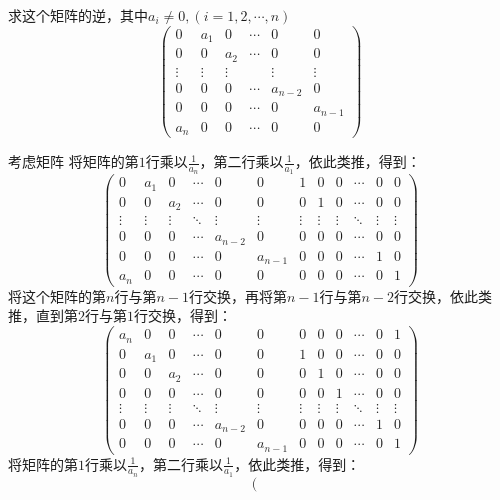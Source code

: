 \begin{example}{}{}
    求这个矩阵的逆，其中$a_i\neq 0,(i=1,2,\cdots,n)$\[\begin{pmatrix}0&a_1&0&\cdots&0&0\\0&0&a_2&\cdots&0&0\\\vdots&\vdots&\vdots&&\vdots&\vdots\\0&0&0&\cdots&a_{n-2}&0\\0&0&0&\cdots&0&a_{n-1}\\a_n&0&0&\cdots&0&0\end{pmatrix}\]
\end{example}
\begin{solution}
    考虑矩阵
将矩阵的第$1$行乘以$\frac{1}{a_n}$，第二行乘以$\frac{1}{a_1}$，依此类推，得到：
\[
\left(\begin{array}{cccccc|cccccc}
0 & a_1 & 0 & \cdots & 0 & 0 & 1 & 0 & 0 & \cdots & 0 & 0 \\
0 & 0 & a_2 & \cdots & 0 & 0 & 0 & 1 & 0 & \cdots & 0 & 0 \\
\vdots & \vdots & \vdots & \ddots & \vdots & \vdots & \vdots & \vdots & \vdots & \ddots & \vdots & \vdots \\
0 & 0 & 0 & \cdots & a_{n-2} & 0 & 0 & 0 & 0 & \cdots & 0 & 0 \\
0 & 0 & 0 & \cdots & 0 & a_{n-1} & 0 & 0 & 0 & \cdots & 1 & 0 \\
a_n & 0 & 0 & \cdots & 0 & 0 & 0 & 0 & 0 & \cdots & 0 & 1
\end{array}\right)
\]
将这个矩阵的第$n$行与第$n-1$行交换，再将第$n-1$行与第$n-2$行交换，依此类推，直到第$2$行与第$1$行交换，得到：
\[
\left(\begin{array}{cccccc|cccccc}
a_n & 0 & 0 & \cdots & 0 & 0 & 0 & 0 & 0 & \cdots & 0 & 1 \\
0 & a_1 & 0 & \cdots & 0 & 0 & 1 & 0 & 0 & \cdots & 0 & 0 \\
0 & 0 & a_2 & \cdots & 0 & 0 & 0 & 1 & 0 & \cdots & 0 & 0 \\
0 & 0 & 0 & \cdots & 0 & 0 & 0 & 0 & 1 & \cdots & 0 & 0 \\
\vdots & \vdots & \vdots & \ddots & \vdots & \vdots & \vdots & \vdots & \vdots & \ddots & \vdots & \vdots \\
0 & 0 & 0 & \cdots & a_{n-2} & 0 & 0 & 0 & 0 & \cdots & 1 & 0 \\
0 & 0 & 0 & \cdots & 0 & a_{n-1} & 0 & 0 & 0 & \cdots & 0 & 1 
\end{array}\right)
\]
将矩阵的第$1$行乘以$\frac{1}{a_n}$，第二行乘以$\frac{1}{a_1}$，依此类推，得到：
\[
\left(\begin{array}{cccccc|cccccc}

\end{array}\]
\end{solution}
